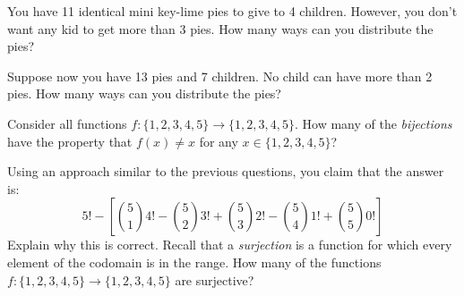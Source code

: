\documentclass[11pt]{exam}
\begin{document}

\begin{questions}
\question You have 11 identical mini key-lime pies to give to 4 children.  However, you don't want any kid to get more than 3 pies.  How many ways can you distribute the pies?
\question Suppose now you have 13 pies and 7 children.  No child can have more than 2 pies.  How many ways can you distribute the pies?
\vfill

\newpage

\question Consider all functions $f: \{1,2,3,4,5\} \to \{1,2,3,4,5\}$.  How many of the {\em bijections} have the property that $f(x) \ne x$ for any $x \in \{1,2,3,4,5\}$?

Using an approach similar to the previous questions, you claim that the answer is:
\[5! - \left[ {5\choose 1}4! - {5 \choose 2}3! + {5\choose 3}2! - {5 \choose 4}1! + {5\choose 5}0! \right]\]
Explain why this is correct.
\vfill
\vfill
\question Recall that a {\em surjection} is a function for which every element of the codomain is in the range.  How many of the functions $f: \{1,2,3,4,5\} \to \{1,2,3,4,5\}$ are surjective?  
\vfill
\vfill
\end{questions}
\end{document}
